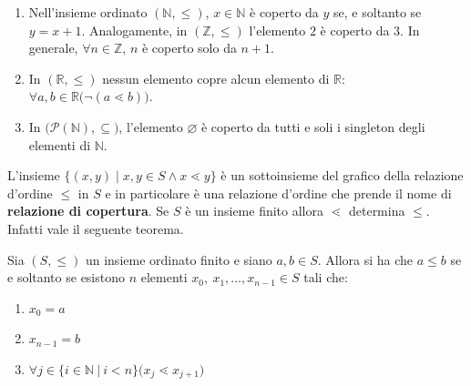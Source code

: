\begin{example}
\begin{enumerate}
	\item Nell'insieme ordinato $(\mathbb{N},\leq)$, $x \in \mathbb{N}$ è coperto da $y$ se, e soltanto se $y=x+1$. Analogamente, in $(\mathbb{Z},\leq)$ l'elemento $2$ è coperto da $3$. In generale, $\forall n \in \mathbb{Z}$, $n$ è coperto solo da $n+1$.

	\item In $(\mathbb{R},\leq)$ nessun elemento copre alcun elemento di $\mathbb{R}$: $\forall a,b \in \mathbb{R} \bigl( \neg (a \lessdot b)\bigr)$.

	\item In $\bigl(\mathcal{P}(\mathbb{N}), \subseteq \bigr)$, l'elemento $\varnothing$ è coperto da tutti e soli i singleton degli elementi di $\mathbb{N}$.
\end{enumerate}
\end{example}

L'insieme $\{(x,y) \; | \; x,y \in S \land x \lessdot y \}$ è un sottoinsieme del grafico della relazione d'ordine $\leq$ in $S$ e in particolare è una relazione d'ordine che prende il nome di \textbf{relazione di copertura}. Se $S$ è un insieme finito allora $\lessdot$ determina $\leq$. Infatti vale il seguente teorema.

\begin{teorbox}
	Sia $(S,\leq)$ un insieme ordinato finito e siano $a,b \in S$. Allora si ha che $a \leq b$ se e soltanto se esistono $n$ elementi $x_{0}, \ x_{1},\ldots, x_{n-1} \in S$ tali che:
	\begin{enumerate}
		\item $x_{0}= a$
		\item $x_{n-1}=b$
		\item $\forall j \in \{i \in \mathbb{N} \ | \ i < n\} \bigl(x_{j} \lessdot x_{j+1}\bigr)$
	\end{enumerate}
\end{teorbox}

